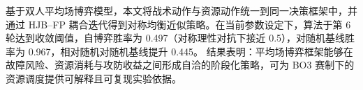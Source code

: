 基于双人平均场博弈模型，本文将战术动作与资源动作统一到同一决策框架中，并通过 HJB--FP 耦合迭代得到对称均衡近似策略。在当前参数设定下，算法于第 6 轮达到收敛阈值，自博弈胜率为 0.497（对称理性对抗下接近 0.5），对随机基线胜率为 0.967，相对随机对随机基线提升 0.445。
结果表明：平均场博弈框架能够在故障风险、资源消耗与攻防收益之间形成自洽的阶段化策略，可为 BO3 赛制下的资源调度提供可解释且可复现实验依据。
